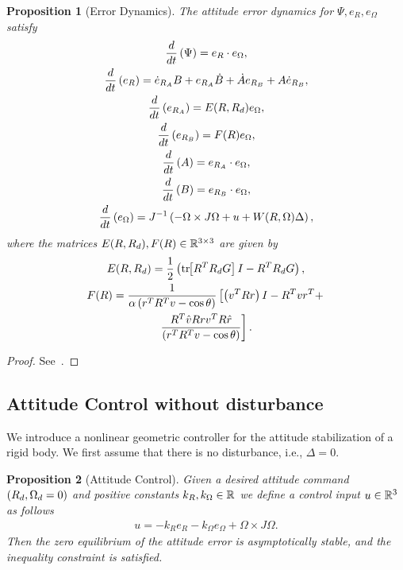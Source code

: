 \documentclass[letterpaper, 10 pt, conference]{ieeeconf}  %
\newtheorem{prop}{Proposition}
\begin{document}
\begin{prop}[Error Dynamics]\label{prop:error_dyn}
	The attitude error dynamics for \( \Psi, e_R, e_\Omega \) satisfy 
	\begin{gather}
		\frac{d }{d t} \left( \Psi \right) = e_R \cdot e_\Omega , \label{eqn:psi_dot}\\
		\frac{d }{d t} \left( e_R \right) = \dot{e}_{R_A} B + e_{R_A} \dot{B} + \dot{A}e_{R_B} + A \dot{e}_{R_B} , \label{eqn:eR_dot}\\
		\frac{d }{d t} \left( e_{R_A} \right) = E(R, R_d) e_\Omega , \label{eqn:eRA_dot} \\
		\frac{d }{d t} \left( e_{R_B} \right) = F(R) e_\Omega , \label{eqn:eRB_dot} \\
		\frac{d }{d t} \left( A \right) = e_{R_A} \cdot e_\Omega , \label{eqn:A_dot} \\
		\frac{d }{d t} \left( B \right) = e_{R_B} \cdot e_\Omega , \label{eqn:B_dot} \\
		\frac{d }{d t} \left( e_\Omega \right) = J^{-1} \left( -\Omega \times J \Omega + u + W(R, \Omega) \Delta \right) , \label{eqn:eW_dot}
	\end{gather}
	where the matrices \(E(R,R_d), F(R) \in \mathbb{R}^{3\times3} \) are given by
	\begin{gather}
		E(R,R_d) = \frac{1}{2} \left( \mathrm{tr}\negthickspace\left[ R^T R_d G \right]I - R^T R_d G \right) , \label{eqn:E} \\
		F(R) = \frac{1}{\alpha \left( r^T R^T v - \cos \theta \right)} \left[\left( v^T R r \right) I - R^T v r^T + \right. \nonumber \\
		\left. \frac{R^T \hat{v} R r v^T R \hat{r}}{\left( r^T R^T v - \cos \theta \right)}\right] . \label{eqn:F}
	\end{gather}
\end{prop}
\begin{proof}
See~.
\end{proof}

\subsection{Attitude Control without disturbance}
We introduce a nonlinear geometric controller for the attitude stabilization of a rigid body.
We first assume that there is no disturbance, i.e., \( \Delta = 0 \).
\begin{prop}[Attitude Control]\label{prop:att_control}
	Given a desired attitude command \( \left( R_d, \Omega_d = 0 \right) \) and positive constants \( k_R, k_\Omega \in \mathbb{R} \) we define a control input \( u \in \mathbb{R}^3 \) as follows
	\begin{gather}
		u = -k_R e_R - k_\Omega e_\Omega + \Omega \times J \Omega . \label{eqn:nodist_control}
	\end{gather}
	Then the zero equilibrium of the attitude error is asymptotically stable, and the inequality constraint is satisfied.
\end{prop}
\end{document}
